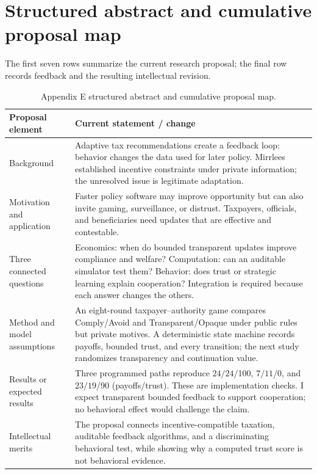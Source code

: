 \clearpage\onecolumn
\section{Structured abstract and cumulative proposal map}\label{app:abstract}
The first seven rows summarize the current research proposal; the final row records feedback and the resulting intellectual revision.
\par\medskip
\begin{table}[H]
\caption{Appendix E structured abstract and cumulative proposal map.}
\label{tab:abstract-map}
\renewcommand{\arraystretch}{1.18}
\begin{tabularx}{\textwidth}{@{}p{}Y@{}}
\toprule
\textbf{Proposal element} & \textbf{Current statement / change} \\
\midrule
Background & Adaptive tax recommendations create a feedback loop: behavior changes the data used for later policy. Mirrlees established incentive constraints under private information; the unresolved issue is legitimate adaptation. \\
Motivation and application & Faster policy software may improve opportunity but can also invite gaming, surveillance, or distrust. Taxpayers, officials, and beneficiaries need updates that are effective and contestable. \\
Three connected questions & Economics: when do bounded transparent updates improve compliance and welfare? Computation: can an auditable simulator test them? Behavior: does trust or strategic learning explain cooperation? Integration is required because each answer changes the others. \\
Method and model assumptions & An eight-round taxpayer--authority game compares Comply/Avoid and Transparent/Opaque under public rules but private motives. A deterministic state machine records payoffs, bounded trust, and every transition; the next study randomizes transparency and continuation value. \\
Results or expected results & Three programmed paths reproduce $24/24$/100, $7/11$/0, and $23/19$/90 (payoffs/trust). These are implementation checks. I expect transparent bounded feedback to support cooperation; no behavioral effect would challenge the claim. \\
Intellectual merits & The proposal connects incentive-compatible taxation, auditable feedback algorithms, and a discriminating behavioral test, while showing why a computed trust score is not behavioral evidence. \\

\end{tabularx}
\end{table}
